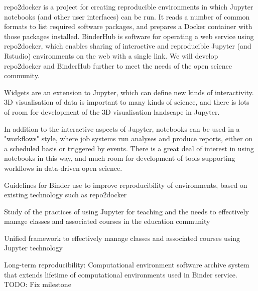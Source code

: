 \begin{workpackage}
\begin{wpdescription}
repo2docker is a project for creating
reproducible environments in which Jupyter notebooks (and other user interfaces) can be run.
It reads a number of common formats to list required software packages,
and prepares a Docker container with those packages installed.
BinderHub is software for operating a web service using repo2docker,
which enables sharing of interactive and reproducible Jupyter (and Rstudio) environments on the web with a single link.
We will develop repo2docker and BinderHub further to meet the needs of the open science community.

Widgets are an extension to Jupyter, which can define new kinds of interactivity.
3D visualisation of data is important to many kinds of science,
and there is lots of room for development of the 3D visualisation landscape in Jupyter.

In addition to the interactive aspects of Jupyter,
notebooks can be used in a "workflows" style,
where job systems run analyses and produce reports,
either on a scheduled basis or triggered by events.
There is a great deal of interest in using notebooks in this way,
and much room for development of tools supporting workflows in data-driven open science.

\end{wpdescription}

\begin{tasklist}
% 





\end{tasklist}


\begin{wpdelivs}
\begin{wpdeliv}[due=12,miles=startup,id=binder-guidelines,dissem=PU,nature=DEC,lead=XFEL]
  {Guidelines for Binder use to improve reproducibility of
  environments, based on existing technology such as repo2docker}
\end{wpdeliv}
\begin{wpdeliv}[due=12,miles=startup,id=teaching-report,dissem=PU,nature=R,lead=EP]
  {Study of the practices of using Jupyter for teaching and the needs to
  effectively manage classes and associated courses in the education community}
\end{wpdeliv}
\begin{wpdeliv}[due=36,miles=community,id=nbgrader-like,dissem=PU,nature=OTHER,lead=EP]
  {Unified framework to effectively manage classes and associated courses
  using Jupyter technology}
\end{wpdeliv}
\begin{wpdeliv}[due=36,miles=community,id=jupyter-archive,dissem=PU,nature=OTHER,lead=XFEL]
  {Long-term reproducibility: Computational environment software
    archive system that extends lifetime of computational environments
  used in Binder service. TODO: Fix milestone}
\end{wpdeliv}


\end{wpdelivs}
\end{workpackage}

